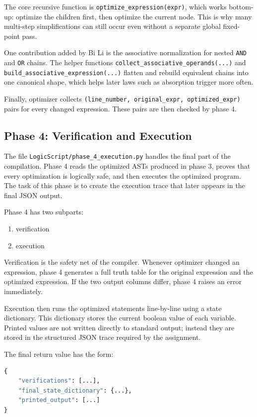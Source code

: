 \documentclass[11pt]{article}
\begin{document}
The core recursive function is \texttt{optimize\_expression(expr)}, which works bottom-up: optimize the children first, then optimize the current node. This is why many multi-step simplifications can still occur even without a separate global fixed-point pass.

One contribution added by Bi Li is the associative normalization for nested \texttt{AND} and \texttt{OR} chains. The helper functions \texttt{collect\_associative\_operands(...)} and \texttt{build\_associative\_expression(...)} flatten and rebuild equivalent chains into one canonical shape, which helps later laws such as absorption trigger more often.

Finally, optimizer collects \texttt{(line\_number, original\_expr, optimized\_expr)} pairs for every changed expression. These pairs are then checked by phase 4.

\subsection{Phase 4: Verification and Execution}
The file \texttt{LogicScript/phase\_4\_execution.py} handles the final part of the compilation. Phase 4 reads the optimized ASTs produced in phase 3, proves that every optimization is logically safe, and then executes the optimized program. The task of this phase is to create the execution trace that later appears in the final JSON output.

Phase 4 has two subparts:
\begin{enumerate}
    \item verification
    \item execution
\end{enumerate}

Verification is the safety net of the compiler. Whenever optimizer changed an expression, phase 4 generates a full truth table for the original expression and the optimized expression. If the two output columns differ, phase 4 raises an error immediately.

Execution then runs the optimized statements line-by-line using a state dictionary. This dictionary stores the current boolean value of each variable. Printed values are not written directly to standard output; instead they are stored in the structured JSON trace required by the assignment.

The final return value has the form:
\begin{lstlisting}[language=Python]
{
    "verifications": [...],
    "final_state_dictionary": {...},
    "printed_output": [...]
}
\end{lstlisting}
\end{document}
